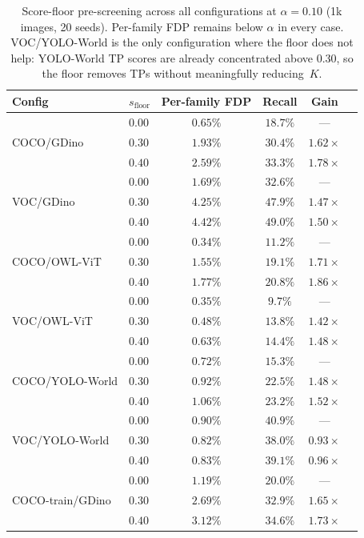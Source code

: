 \documentclass{article}
\theoremstyle{remark}
\newcommand{\1}{\mathbf{1}}
\begin{document}
\begin{table}[h]
\centering
\small
\begin{tabular*}{\linewidth}{@{\extracolsep{\fill}}llcccc@{}}
\toprule
Config & $s_{\mathrm{floor}}$ & Per-family FDP & Recall & Gain \\
\midrule
\multirow{3}{*}{COCO/GDino}
 & $0.00$ & $0.65\%$ & $18.7\%$ & --- \\
 & $0.30$ & $1.93\%$ & $30.4\%$ & $1.62\times$ \\
 & $0.40$ & $2.59\%$ & $33.3\%$ & $1.78\times$ \\
\midrule
\multirow{3}{*}{VOC/GDino}
 & $0.00$ & $1.69\%$ & $32.6\%$ & --- \\
 & $0.30$ & $4.25\%$ & $47.9\%$ & $1.47\times$ \\
 & $0.40$ & $4.42\%$ & $49.0\%$ & $1.50\times$ \\
\midrule
\multirow{3}{*}{COCO/OWL-ViT}
 & $0.00$ & $0.34\%$ & $11.2\%$ & --- \\
 & $0.30$ & $1.55\%$ & $19.1\%$ & $1.71\times$ \\
 & $0.40$ & $1.77\%$ & $20.8\%$ & $1.86\times$ \\
\midrule
\multirow{3}{*}{VOC/OWL-ViT}
 & $0.00$ & $0.35\%$ & $9.7\%$ & --- \\
 & $0.30$ & $0.48\%$ & $13.8\%$ & $1.42\times$ \\
 & $0.40$ & $0.63\%$ & $14.4\%$ & $1.48\times$ \\
\midrule
\multirow{3}{*}{COCO/YOLO-World}
 & $0.00$ & $0.72\%$ & $15.3\%$ & --- \\
 & $0.30$ & $0.92\%$ & $22.5\%$ & $1.48\times$ \\
 & $0.40$ & $1.06\%$ & $23.2\%$ & $1.52\times$ \\
\midrule
\multirow{3}{*}{VOC/YOLO-World}
 & $0.00$ & $0.90\%$ & $40.9\%$ & --- \\
 & $0.30$ & $0.82\%$ & $38.0\%$ & $0.93\times$ \\
 & $0.40$ & $0.83\%$ & $39.1\%$ & $0.96\times$ \\
\midrule
\multirow{3}{*}{COCO-train/GDino}
 & $0.00$ & $1.19\%$ & $20.0\%$ & --- \\
 & $0.30$ & $2.69\%$ & $32.9\%$ & $1.65\times$ \\
 & $0.40$ & $3.12\%$ & $34.6\%$ & $1.73\times$ \\
\bottomrule
\end{tabular*}
\caption{Score-floor pre-screening across all configurations at
$\alpha=0.10$ (1k images, 20 seeds). Per-family FDP remains below
$\alpha$ in every case. VOC/YOLO-World is the only configuration
where the floor does not help: YOLO-World TP scores are already
concentrated above $0.30$, so the floor removes TPs without
meaningfully reducing~$K$.}
\label{tab:score_floor_cross}
\end{table}
\end{document}
